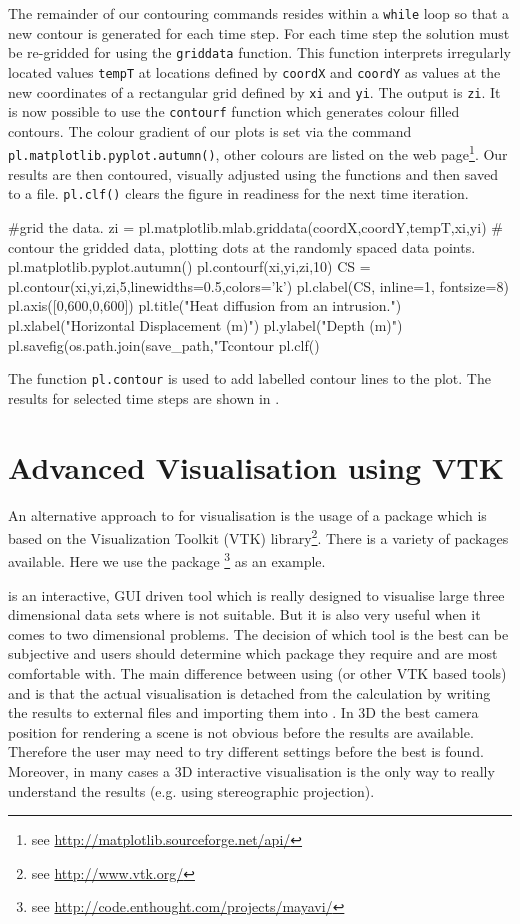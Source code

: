 The remainder of our contouring commands resides within a \verb|while| loop so
that a new contour is generated for each time step. For each time step the
solution must be re-gridded for \modmpl using the \verb|griddata| function. This
function interprets irregularly located values \verb|tempT| at locations defined
by \verb|coordX| and \verb|coordY| as values at the new coordinates of a
rectangular grid defined by
\verb|xi| and \verb|yi|. The output is \verb|zi|. It is now possible to use the
\verb|contourf| function which generates colour filled contours. The colour
gradient of our plots is set via the command 
\verb|pl.matplotlib.pyplot.autumn()|, other colours are listed on the \modmpl web page\footnote{see
\url{http://matplotlib.sourceforge.net/api/}}. Our results are then contoured,
visually adjusted using the \modmpl functions and then saved to a file.
\verb|pl.clf()| clears the figure in readiness for the next time iteration.
\begin{python}
#grid the data.
zi = pl.matplotlib.mlab.griddata(coordX,coordY,tempT,xi,yi)
# contour the gridded data, plotting dots at the randomly spaced data points.
pl.matplotlib.pyplot.autumn()
pl.contourf(xi,yi,zi,10)
CS = pl.contour(xi,yi,zi,5,linewidths=0.5,colors='k')
pl.clabel(CS, inline=1, fontsize=8)
pl.axis([0,600,0,600])
pl.title("Heat diffusion from an intrusion.")
pl.xlabel("Horizontal Displacement (m)")
pl.ylabel("Depth (m)")
pl.savefig(os.path.join(save_path,"Tcontour%
pl.clf()        
\end{python}
The function \verb|pl.contour| is used to add labelled contour lines to the
plot. 
The results for selected time steps are shown in .


\section{Advanced Visualisation using VTK}

An alternative approach to \modmpl for visualisation is the usage of a package
which is based on the Visualization Toolkit (VTK) library\footnote{see \url{http://www.vtk.org/}}.
There is a variety of packages available. Here we use the package \mayavi\footnote{see
\url{http://code.enthought.com/projects/mayavi/}} as an example. 

\mayavi is an interactive, GUI driven tool which is 
really designed to visualise large three dimensional data sets where \modmpl 
is not suitable. But it is also very useful when it comes to two dimensional
problems. 
The decision of which tool is the best can be subjective and users should
determine which package they require and are most comfortable with. The main
difference between using \mayavi (or other VTK based tools) and \modmpl is that
the actual visualisation is detached from the calculation by writing the
results to external files and importing them into \mayavi. In 3D the best
camera position for rendering a scene is not obvious before the results are
available. Therefore the user may need to try different settings before the
best is found. Moreover, in many cases a 3D interactive visualisation is the
only way to really understand the results (e.g. using stereographic projection).

